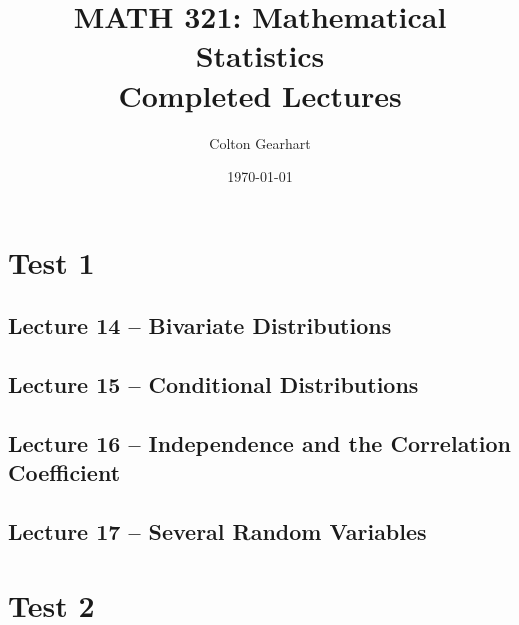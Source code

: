 \documentclass{article}
\title{MATH 321: Mathematical Statistics\\Completed Lectures}
\author{Colton Gearhart}
\date{\today}
\begin{document}
\setcounter{secnumdepth}{0}		%
\maketitle
\dosecttoc
\tableofcontents
\newpage

\section{Test 1}

\secttoc

\subsection{Lecture 14 -- Bivariate Distributions}
\newpage

\subsection{Lecture 15 -- Conditional Distributions}
\newpage

\subsection{Lecture 16 -- Independence and the Correlation Coefficient}
\newpage

\subsection{Lecture 17 -- Several Random Variables}
\newpage


\section{Test 2}
\end{document}
